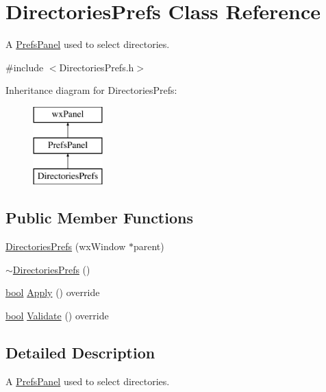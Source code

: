 \hypertarget{class_directories_prefs}{}\section{Directories\+Prefs Class Reference}
\label{class_directories_prefs}


A \hyperlink{class_prefs_panel}{Prefs\+Panel} used to select directories.  




{\ttfamily \#include $<$Directories\+Prefs.\+h$>$}

Inheritance diagram for Directories\+Prefs\+:\begin{figure}[H]
\begin{center}
\leavevmode
\includegraphics[height=3.000000cm]{class_directories_prefs}
\end{center}
\end{figure}
\subsection*{Public Member Functions}
\begin{DoxyCompactItemize}
\item 
\hyperlink{class_directories_prefs_a01d8aa14177a79135e74809814170f21}{Directories\+Prefs} (wx\+Window $\ast$parent)
\item 
\hyperlink{class_directories_prefs_af36b2f52e00a1e4c73b8ff299150e2ff}{$\sim$\+Directories\+Prefs} ()
\item 
\hyperlink{mac_2config_2i386_2lib-src_2libsoxr_2soxr-config_8h_abb452686968e48b67397da5f97445f5b}{bool} \hyperlink{class_directories_prefs_a45ba8010e73bc2114915fadcd032b961}{Apply} () override
\item 
\hyperlink{mac_2config_2i386_2lib-src_2libsoxr_2soxr-config_8h_abb452686968e48b67397da5f97445f5b}{bool} \hyperlink{class_directories_prefs_a45eff11a888e1d6a993ba13bbca0e507}{Validate} () override
\end{DoxyCompactItemize}


\subsection{Detailed Description}
A \hyperlink{class_prefs_panel}{Prefs\+Panel} used to select directories. 

